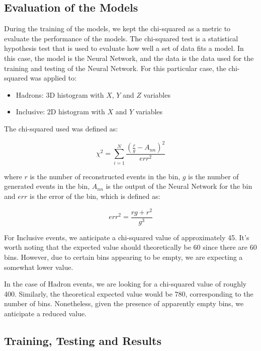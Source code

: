 \documentclass[EPJ,twocolumn]{webofc}
\begin{document}
\subsection{Evaluation of the Models}

During the training of the models, we kept the chi-squared as a metric to evaluate the performance of the models.
The chi-squared test is a statistical hypothesis test that is used to evaluate how well a set of data fits a model.
In this case, the model is the Neural Network, and the data is the data used for the training and testing of the Neural Network.
For this particular case, the chi-squared was applied to:
\begin{itemize}
    \item Hadrons: 3D histogram with $X$, $Y$ and $Z$ variables
    \item Inclusive: 2D histogram with $X$ and $Y$ variables
\end{itemize}

The chi-squared used was defined as:

\begin{equation}
    \chi^2 = \sum_{i=1}^{N} \frac{(\frac{r}{g} - A_{nn})^2}{err^2}
\end{equation}
    
where $r$ is the number of reconstructed events in the bin, $g$ is the number of generated events in the bin, $A_{nn}$ is the output of the Neural Network for the bin and $err$ is the error of the bin, which is defined as:

\begin{equation}
    err^2 = \frac{rg + r^2}{g^3}
\end{equation}

For Inclusive events, we anticipate a chi-squared value of approximately 45. It's worth noting that the expected value should theoretically be 60 since there are 60 bins. However, due to certain bins appearing to be empty, we are expecting a somewhat lower value.

In the case of Hadron events, we are looking for a chi-squared value of roughly 400. Similarly, the theoretical expected value would be 780, corresponding to the number of bins. Nonetheless, given the presence of apparently empty bins, we anticipate a reduced value.

\subsection{Training, Testing and Results}
\end{document}

